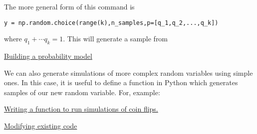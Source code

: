   The more general form of this command is
\begin{Verbatim}
y = np.random.choice(range(k),n_samples,p=[q_1,q_2,...,q_k])
 \end{Verbatim}
 where $q_1 + \cdots q_k = 1$. This will generate a sample from



 \begin{exercise}
 \href{https://colab.research.google.com/drive/1Gs-gSsUP1hHVwhrbwvWzLVm1ulcLJKRI#scrollTo=_c4br6SCUtUy}{Building a probability model}
\end{exercise}

 We can also generate simulations of more complex random variables using simple ones.  In this case, it is useful to define a function in Python which generates samples of our new random variable. For, example:
 \begin{example}
 \href{https://colab.research.google.com/drive/1Gs-gSsUP1hHVwhrbwvWzLVm1ulcLJKRI#scrollTo=xCU9OVTijAmC&line=2&uniqifier=1}{Writing a function to run simulations of coin flips.}
\end{example}



\begin{exercise}
 \href{https://colab.research.google.com/drive/1Gs-gSsUP1hHVwhrbwvWzLVm1ulcLJKRI#scrollTo=YfinIy4lsXnH}{Modifying existing code}
\end{exercise}

